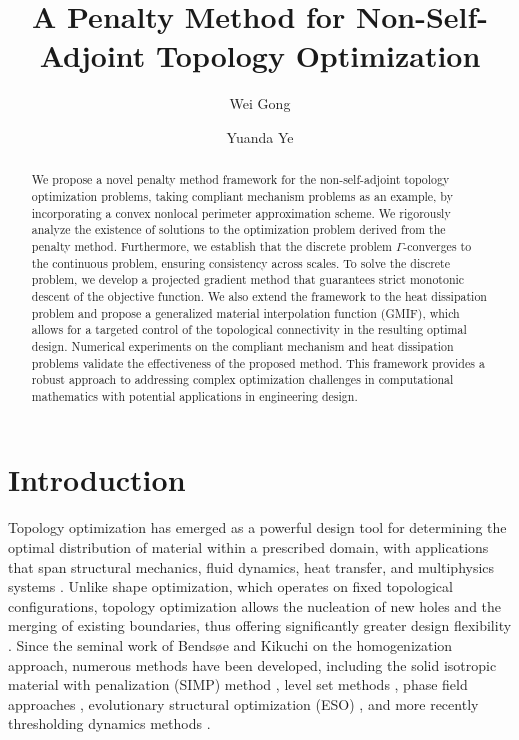 \documentclass{amsart}
\author{Wei Gong}
\author{Yuanda Ye}
\title[A Penalty Method for Non-Self-Adjoint Topology Optimization]%
{A Penalty Method for Non-Self-Adjoint Topology Optimization}
\begin{document}

\begin{abstract}
We propose a novel penalty method framework for the non-self-adjoint topology optimization problems, taking compliant mechanism problems as an example, by incorporating a convex nonlocal perimeter approximation scheme. We rigorously analyze the existence of solutions to the optimization problem derived from the penalty method. Furthermore, we establish that the discrete problem \(\Gamma\)-converges to the continuous problem, ensuring consistency across scales. To solve the discrete problem, we develop a projected gradient method that guarantees strict monotonic descent of the objective function. We also extend the framework to the heat dissipation problem and propose a generalized material interpolation function (GMIF), which allows for a targeted control of the topological connectivity in the resulting optimal design. Numerical experiments on the compliant mechanism and heat dissipation problems validate the effectiveness of the proposed method. This framework provides a robust approach to addressing complex optimization challenges in computational mathematics with potential applications in engineering design.
\end{abstract}

\maketitle
\section{Introduction}
Topology optimization has emerged as a powerful design tool for determining the optimal distribution of material within a prescribed domain, with applications that span structural mechanics, fluid dynamics, heat transfer, and multiphysics systems \cite{WANG2003227,Bend1989,Sigmund2013,ZHU2020103622}. Unlike shape optimization, which operates on fixed topological configurations, topology optimization allows the nucleation of new holes and the merging of existing boundaries, thus offering significantly greater design flexibility \cite{alla,Sigmund2013}. Since the seminal work of Bendsøe and Kikuchi \cite{Bend1989} on the homogenization approach, numerous methods have been developed, including the solid isotropic material with penalization (SIMP) method \cite{Bend1989}, level set methods \cite{OSHER198812,Stolpe2001,Osher2003,ALLAIRE2004363}, phase field approaches \cite{LI2025103939,JIN2024112932}, evolutionary structural optimization (ESO) \cite{Xie1993}, and more recently thresholding dynamics methods \cite{CHEN2024113119,CHEN202311891216}.
\end{document}
